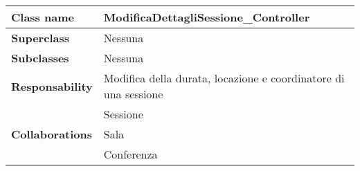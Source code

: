 \begin{table}[h!]
	\begin{tabular}{|l|l|}
		\hline 
		\textbf{Class name} & ModificaDettagliSessione\_Controller
		\\ \hline
		\textbf{Superclass} & Nessuna
		\\ \hline
		\multirow{1}{*}{\textbf{Subclasses}} & Nessuna
		\\ \hline
		\textbf{Responsability} & Modifica della durata, locazione e coordinatore di una sessione
		\\ \hline
		\multirow{3}{*}{\textbf{Collaborations}} & Sessione \\
		& Sala \\
		& Conferenza
		\\ \hline
	\end{tabular}
\end{table}

